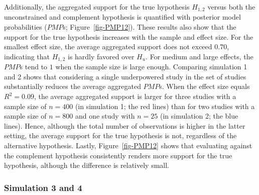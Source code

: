 \documentclass[
]{interact}
\begin{document}
                    Additionally, the aggregated support for the true hypothesis \(H_{1,2}\)
                    versus both the unconstrained and complement hypothesis is quantified
                    with posterior model probabilities (\(PMP\)s; Figure~\ref{fig-PMP12}).
                    These results also show that the support for the true hypothesis
                    increases with the sample and effect size. For the smallest effect size,
                    the average aggregated support does not exceed \(0.70\), indicating that
                    \(H_{1,2}\) is hardly favored over \(H_u\). For medium and large
                    effects, the \(PMP\)s tend to \(1\) when the sample size is large
                    enough. Comparing simulation 1 and 2 shows that considering a single
                    underpowered study in the set of studies substantially reduces the
                    average aggregated \(PMP\)s. When the effect size equals \(R^2 = 0.09\),
                    the average aggregated support is larger for three studies with a sample
                    size of \(n = 400\) (in simulation 1; the red lines) than for two
                    studies with a sample size of \(n = 800\) and one study with \(n = 25\)
                    (in simulation 2; the blue lines). Hence, although the total number of
                    observations is higher in the latter setting, the average support for
                    the true hypothesis is not, regardless of the alternative hypothesis.
                    Lastly, Figure~\ref{fig-PMP12} shows that evaluating against the
                    complement hypothesis consistently renders more support for the true
                    hypothesis, although the difference is relatively small.
                    
                    \hypertarget{simulation-3-and-4}{%
                      \subsubsection{Simulation 3 and 4}\label{simulation-3-and-4}}
                    
\end{document}
